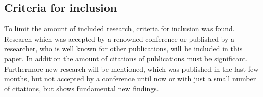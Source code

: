 \subsection{Criteria for inclusion}
To limit the amount of included research, criteria for inclusion was found. Research which was accepted by a renowned conference or published by a researcher, who is well known for other publications, will be included in this paper. In addition the amount of citations of publications must be significant. Furthermore new research will be mentioned, which was published in the last few months, but not accepted by a conference until now or with just a small number of citations, but shows fundamental new findings.